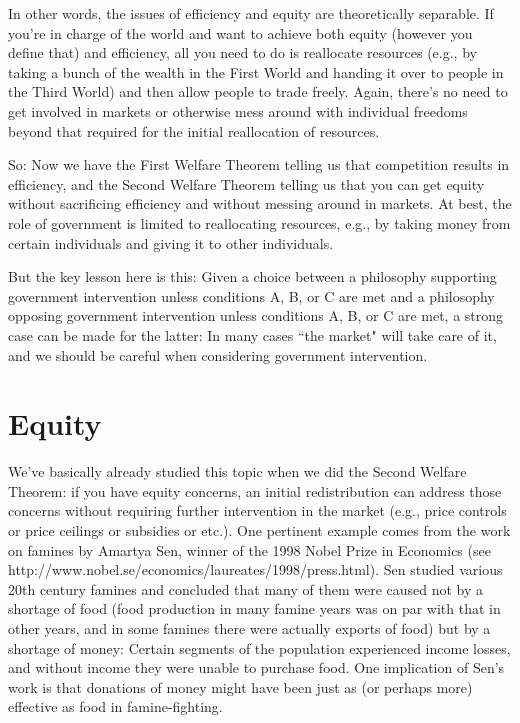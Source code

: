 In other words, the issues of efficiency and equity are theoretically separable. If you're in charge of the world and want to achieve both equity (however you define that) and efficiency, all you need to do is reallocate resources (e.g., by taking a bunch of the wealth in the First World and handing it over to people in the Third World) and then allow people to trade freely. Again, there's no need to get involved in markets or otherwise mess around with individual freedoms beyond that required for the initial reallocation of resources. 


So: Now we have the First Welfare Theorem telling us that competition results in efficiency, and the Second Welfare Theorem telling us that you can get equity without sacrificing efficiency and without messing around in markets. At best, the role of government is limited to reallocating resources, e.g., by taking money from certain individuals and giving it to other individuals.


But the key lesson here is this: Given a choice between a philosophy supporting government intervention unless conditions A, B, or C are met and a philosophy opposing government intervention unless conditions A, B, or C are met, a strong case can be made for the latter: In many cases ``the market" will take care of it, and we should be careful when considering government intervention.










\chapter{Equity}


We've basically already studied this topic when we did the Second Welfare Theorem: if you have equity concerns, an initial redistribution can address those concerns without requiring further intervention in the market (e.g., price controls or price ceilings or subsidies or etc.). One pertinent example comes from the work on famines by Amartya Sen, winner of the 1998 Nobel Prize in Economics (see http://www.nobel.se/economics/laureates/1998/press.html). Sen studied various 20th century famines and concluded that many of them were caused not by a shortage of food (food production in many famine years was on par with that in other years, and in some famines there were actually exports of food) but by a shortage of money: Certain segments of the population experienced income losses, and without income they were unable to purchase food. One implication of Sen's work is that donations of money might have been just as (or perhaps more) effective as food in famine-fighting. 

